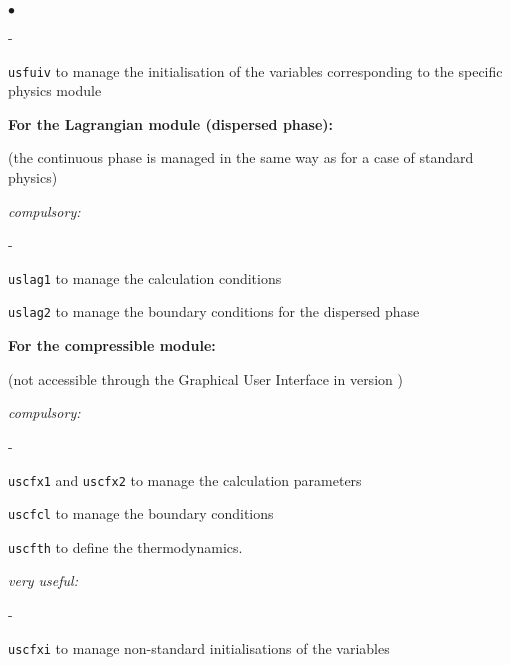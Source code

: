 {{{\begin{list}{$\bullet$}{}
\begin{list}{}{}
\begin{list}{}{}
\begin{list}{-}{}
            \item \texttt{usfuiv} to manage the initialisation of the
                   variables corresponding to the specific physics module
        \end{list}
    \end{list}


    \item{\bf For the Lagrangian module (dispersed phase):}

(the continuous phase is managed in the same way as for a case of standard
physics)\\
    \begin{list}{}{}
        \item {\em compulsory:}
        \begin{list}{-}{}
            \item \texttt{uslag1} to manage the calculation conditions

            \item \texttt{uslag2} to manage the boundary conditions for the
             dispersed phase

        \end{list}

    \end{list}

   \item {\bf For the compressible module:}

(not accessible through the Graphical User Interface in version \verscs)
    \begin{list}{}{}
        \item {\em compulsory:}
        \begin{list}{-}{}
            \item \texttt{uscfx1} and \texttt{uscfx2} to manage the
                  calculation parameters

            \item \texttt{uscfcl} to manage the boundary conditions

            \item \texttt{uscfth} to define the thermodynamics.
        \end{list}

        \item {\em very useful:}
        \begin{list}{-}{}
                \item \texttt{uscfxi} to manage non-standard initialisations of the variables
        \end{list}
    \end{list}


\end{list}
\end{list}}}}
